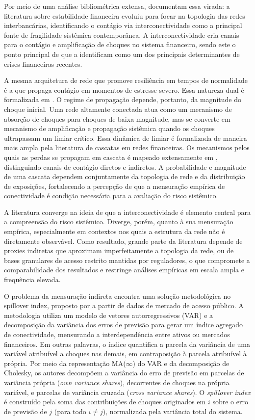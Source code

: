 \documentclass[12pt, a4paper, oneside, english, brazil]{abntex2}
\begin{document}
Por meio de uma análise bibliométrica extensa, \textcite{silva2017}
documentam essa virada: a literatura sobre estabilidade financeira evoluiu
para focar na topologia das redes interbancárias,
identificando o contágio via interconectividade como a principal fonte de
fragilidade sistêmica contemporânea. A interconectividade cria canais para o 
contágio e amplificação de choques no sistema financeiro, sendo este o ponto 
principal de \textcite{glasserman2015} que a identificam como um dos principais 
determinantes de crises financeiras recentes.

A mesma arquitetura de rede que promove resiliência em tempos de normalidade é a que propaga
contágio em momentos de estresse severo. Essa natureza dual é formalizada em 
\textcite{acemoglu2015}. O regime de propagação depende, portanto, da magnitude do choque 
inicial. 
Uma rede altamente conectada atua como um mecanismo de absorção de choques para
choques de baixa magnitude, mas se converte em mecanismo de amplificação e
propagação sistêmica quando os choques ultrapassam um limiar crítico. Essa dinâmica de limiar
é formalizada de maneira mais ampla pela literatura de cascatas em redes financeiras.
Os mecanismos pelos quais as perdas se propagam em cascata é mapeado extensamente em 
\textcite{glasserman2016},
distinguindo canais de contágio diretos e indiretos. A 
probabilidade e magnitude de uma cascata dependem conjuntamente da topologia de 
rede e da distribuição de exposições, fortalecendo a percepção de que a mensuração 
empírica de conectividade é condição necessária para a avaliação do risco sistêmico.

A literatura converge na ideia de que a interconectividade é elemento central
para a compreensão do risco sistêmico. Diverge, porém, quanto à sua mensuração
empírica, especialmente em contextos nos quais a estrutura da rede não é diretamente
observável. Como resultado, grande parte da literatura depende de proxies indiretas que
aproximam imperfeitamente a topologia da rede, ou de bases granulares de acesso restrito
mantidas por reguladores, o que compromete a comparabilidade dos resultados e restringe
análises empíricas em escala ampla e frequência elevada.

O problema da mensuração indireta encontra uma solução metodológica no spillover index, 
proposto por \textcite{diebold2009} a partir de dados de mercado de acesso público. 
A metodologia utiliza um modelo de vetores autorregressivos (VAR) e a decomposição da 
variância dos erros de previsão para gerar um índice agregado de conectividade, mensurando a 
interdependência entre ativos ou mercados financeiros. 
Em outras palavras, o índice quantifica a parcela da variância de
uma variável atribuível a choques nas demais, em contraposição à parcela atribuível à
própria. Por meio da representação MA($\infty$) do VAR e da decomposição de Cholesky,
os autores decompõem a variância do erro de previsão em parcelas de variância própria
(\textit{own variance shares}), decorrentes de choques na própria variável, e parcelas
de variância cruzada (\textit{cross variance shares}). O \textit{spillover index} é
construído pela soma das contribuições de choques originados em $i$ sobre o erro de
previsão de $j$ (para todo $i \neq j$), normalizada pela variância total do sistema.
\end{document}

